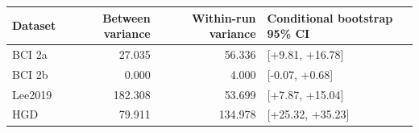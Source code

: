 \begin{tabular}{@{}lrrl@{}}
\toprule
Dataset & Between variance & Within-run variance & Conditional bootstrap 95\% CI \\
\midrule
BCI 2a & 27.035 & 56.336 & [+9.81, +16.78] \\
BCI 2b & 0.000 & 4.000 & [-0.07, +0.68] \\
Lee2019 & 182.308 & 53.699 & [+7.87, +15.04] \\
HGD & 79.911 & 134.978 & [+25.32, +35.23] \\
\bottomrule
\end{tabular}

